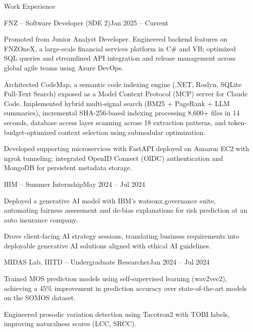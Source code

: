 \documentclass[10pt]{resume}
\begin{document}
    \begin{rSection}{Work Experience}
        \begin{rSubsection}{FNZ -- Software Developer (SDE 2)}{Jan 2025 -- Current}
            \item Promoted from Junior Analyst Developer. Engineered backend features on FNZOneX, a large-scale financial services platform in C\# and VB; optimized SQL queries and streamlined API integration and release management across global agile teams using Azure DevOps.
            \item Architected CodeMap, a semantic code indexing engine (.NET, Roslyn, SQLite Full-Text Search) exposed as a Model Context Protocol (MCP) server for Claude Code. Implemented hybrid multi-signal search (BM25 + PageRank + LLM summaries), incremental SHA-256-based indexing processing 8,600+ files in 14 seconds, database access layer scanning across 18 extraction patterns, and token-budget-optimized context selection using submodular optimization.
            \item Developed supporting microservices with FastAPI deployed on Amazon EC2 with ngrok tunneling; integrated OpenID Connect (OIDC) authentication and MongoDB for persistent metadata storage.
        \end{rSubsection}

        \begin{rSubsection}{IBM -- Summer Internship}{May 2024 -- Jul 2024}
            \item Deployed a generative AI model with IBM's watsonx.governance suite, automating fairness assessment and de-bias explanations for risk prediction at an auto insurance company.
            \item Drove client-facing AI strategy sessions, translating business requirements into deployable generative AI solutions aligned with ethical AI guidelines.
        \end{rSubsection}

        \begin{rSubsection}{MIDAS Lab, IIITD -- Undergraduate Researcher}{Jan 2024 -- Jul 2024}
            \item Trained MOS prediction models using self-supervised learning (wav2vec2), achieving a 45\% improvement in prediction accuracy over state-of-the-art models on the SOMOS dataset.
            \item Engineered prosodic variation detection using Tacotron2 with TOBI labels, improving naturalness scores (LCC, SRCC).
        \end{rSubsection}

    \end{rSection}
\end{document}

